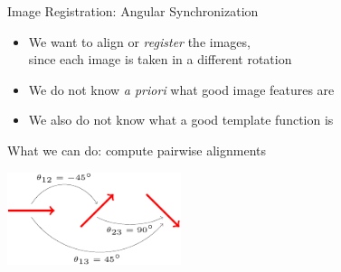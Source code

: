 \documentclass[10pt,aspectratio=169]{beamer}
\begin{document}
\begin{frame}{Image Registration: Angular Synchronization}

\begin{itemize}
\item We want to align or {\em register} the images, \\since each image is taken in a different rotation
\item We do not know {\em a priori} what good image features are
\item We also do not know what a good template function is
\end{itemize}

\vspace{0.1in}
\begin{center}
\textcolor{bold}{What we can do:} compute pairwise alignments

\vspace{0.1in}
\includegraphics[width=2in]{synchronization1}
\end{center}

\end{frame}
\end{document}
